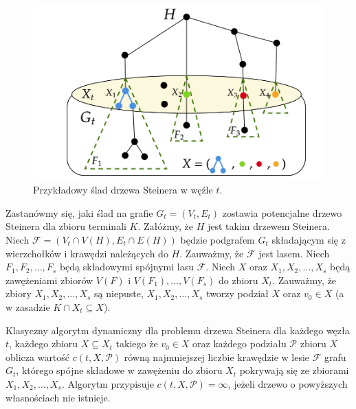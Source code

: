 \documentclass[12pt, oneside]{report}
\begin{document}
\begin{figure}
\centering
\includegraphics[width=16cm]{steiner_tree.png}
\caption{Przykładowy ślad drzewa Steinera w węźle $t$.}
\label{steiner_tree}
\end{figure}

Zastanówmy się, jaki ślad na grafie $G_t = (V_t, E_t)$ zostawia potencjalne drzewo Steinera dla zbioru terminali $K$. Załóżmy, że $H$ jest takim drzewem Steinera. Niech $\mathcal{F} = (V_t \cap V(H), E_t \cap E(H))$ będzie podgrafem $G_t$ składającym się z wierzchołków i krawędzi należących do $H$. Zauważmy, że $\mathcal{F}$ jest lasem. Niech $F_1, F_2, \ldots, F_s$ będą składowymi spójnymi lasu $\mathcal{F}$. Niech $X$ oraz $X_1, X_2, \ldots, X_s$ będą zawężeniami zbiorów $V(F)$ i $V(F_1), \ldots, V(F_s)$ do zbioru $X_t$. Zauważmy, że zbiory $X_1, X_2, \ldots, X_s$ są niepuste, $X_1, X_2, \ldots, X_s$ tworzy podział $X$ oraz $v_0 \in X$ (a w zasadzie $K \cap X_t \subseteq X$).

Klasyczny algorytm dynamiczny dla problemu drzewa Steinera dla każdego węzła $t$, każdego zbioru $X \subseteq X_t$ takiego że $v_0 \in X$ oraz każdego podziału $\mathcal{P}$ zbioru $X$ oblicza wartość $c(t, X, \mathcal{P})$ równą najmniejszej liczbie krawędzie w lesie $\mathcal{F}$ grafu $G_t$, którego spójne składowe w zawężeniu do zbioru $X_t$ pokrywają się ze zbiorami $X_1, X_2, \ldots, X_s$. Algorytm przypisuje $c(t, X, \mathcal{P}) = \infty$, jeżeli drzewo o powyższych własnościach nie istnieje.
\end{document}
